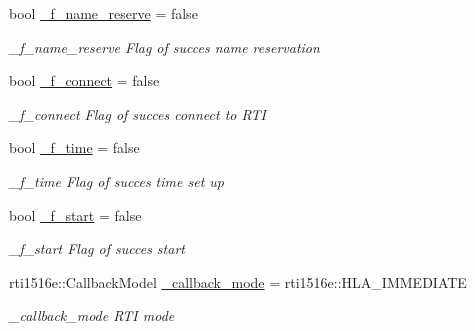 \begin{DoxyCompactItemize}
\mbox{\label{classUPIM_1_1UPIMFederate_a786b216c1232dcfd51dfdb1c6c484668}} 
bool \hyperlink{classUPIM_1_1UPIMFederate_a786b216c1232dcfd51dfdb1c6c484668}{\+\_\+f\+\_\+name\+\_\+reserve} = false
\begin{DoxyCompactList}\small\item\em \+\_\+f\+\_\+name\+\_\+reserve Flag of succes name reservation \end{DoxyCompactList}\item 
\mbox{\label{classUPIM_1_1UPIMFederate_a2d84162c5f613e3f0f60370952ff06e2}} 
bool \hyperlink{classUPIM_1_1UPIMFederate_a2d84162c5f613e3f0f60370952ff06e2}{\+\_\+f\+\_\+connect} = false
\begin{DoxyCompactList}\small\item\em \+\_\+f\+\_\+connect Flag of succes connect to R\+TI \end{DoxyCompactList}\item 
\mbox{\label{classUPIM_1_1UPIMFederate_a829b56928902b5fd934f027740a34332}} 
bool \hyperlink{classUPIM_1_1UPIMFederate_a829b56928902b5fd934f027740a34332}{\+\_\+f\+\_\+time} = false
\begin{DoxyCompactList}\small\item\em \+\_\+f\+\_\+time Flag of succes time set up \end{DoxyCompactList}\item 
\mbox{\label{classUPIM_1_1UPIMFederate_a3e592309c4e890dfb4412a5565acd016}} 
bool \hyperlink{classUPIM_1_1UPIMFederate_a3e592309c4e890dfb4412a5565acd016}{\+\_\+f\+\_\+start} = false
\begin{DoxyCompactList}\small\item\em \+\_\+f\+\_\+start Flag of succes start \end{DoxyCompactList}\item 
\mbox{\label{classUPIM_1_1UPIMFederate_ad95d5b580c69af7b4d12ef47df0b7597}} 
rti1516e\+::\+Callback\+Model \hyperlink{classUPIM_1_1UPIMFederate_ad95d5b580c69af7b4d12ef47df0b7597}{\+\_\+callback\+\_\+mode} = rti1516e\+::\+H\+L\+A\+\_\+\+I\+M\+M\+E\+D\+I\+A\+TE
\begin{DoxyCompactList}\small\item\em \+\_\+callback\+\_\+mode R\+TI mode \end{DoxyCompactList}\item 

\end{DoxyCompactItemize}
